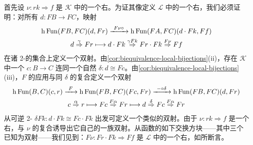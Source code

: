 首先设 $\nu\colon rk\Rightarrow f$ 是 $\mathcal{K}$ 中的一个右\trExtension。为证其像定义 $\mathcal{L}$ 中的一个右\trExtension，我们必须证明：对所有 $d\colon FB\to FC$，映射
\begin{equation*}
\begin{gathered}
\mathrm{h}\operatorname{Fun}(FB,FC)(d,Fr)\xrightarrow{\ F\nu\circ\ }\mathrm{h}\operatorname{Fun}(FA,FC)(d\cdot Fk,Ff)\\
d\overset{\gamma}{\Rightarrow}Fr\longmapsto d\cdot Fk\overset{\gamma Fk}{\Rightarrow}Fr\cdot Fk\overset{F\nu}{\Rightarrow}Ff
\end{gathered}
\end{equation*}
在诸 2-\trCell{}的集合上定义一个双射。由\cref{cor:biequivalence-local-bijections}(ii)，存在 $\mathcal{K}$ 中一个\trFunctor{} $c\colon B\to C$ 连同一个自然\trIsomorphism{} $\delta\colon d\cong Fc$。由\cref{cor:biequivalence-local-bijections}(iii)，$F$ 的应用与同 $\delta$ 的复合定义一个双射
\begin{equation*}
\begin{gathered}
\hFun(B,C)(c,r)\xrightarrow{\ F\ }\hFun(FB,FC)(Fc,Fr)\xrightarrow{\ -\circ\delta\ }\hFun(FB,FC)(d,Fr)\\
c\overset{\alpha}{\Rightarrow}r\longmapsto Fc\overset{F\alpha}{\Rightarrow}Fr\longmapsto d\overset{\delta}{\Rightarrow}Fc\overset{F\alpha}{\Rightarrow}Fr
\end{gathered}
\end{equation*}
从可逆 2-\trCell{} $\delta Fk\colon d\cdot Fk\cong Fc\cdot Fk$ 出发可定义一个类似的双射。由于 $\nu\colon rk\Rightarrow f$ 是一个右\trExtension，与 $\nu$ 的复合诱导出它自己的一族双射。从函数的如下交换方块——其中三个已知为双射——我们见到：$F\nu\colon Fr\cdot Fk\Rightarrow Ff$ 是 $\mathcal{L}$ 中的一个右\trExtension，如所断言。
\begin{center}
\end{center}

